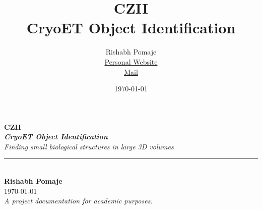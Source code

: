 \documentclass{report}
\title{\textbf{\Huge{CZII}\\CryoET Object Identification}}
\author{\huge{Rishabh Pomaje}\\
\href{https://sites.google.com/view/rishabh-pomaje/about}{Personal Website}\\
\href{rishabhpomaje@gmail.com}{Mail}}
\date{\today}
\begin{document}
\begin{titlepage}
    \centering
    {\Huge\bfseries CZII \\[0.5cm]
    \textcolor{green!50!black}{\textit{CryoET Object Identification}}}\\[2cm]
    
    {\Large\itshape Finding small biological structures in large 3D volumes}\\[2.5cm]
    
    \rule{\textwidth}{0.5mm} \\[0.5cm]
    
    {\large\textbf{Rishabh Pomaje}}\\[0.2cm]
    
    
    {\today}\\[2.5cm]
    
    {\itshape A project documentation for academic purposes.}
\end{titlepage}

\newpage%
\tableofcontents
\pagebreak




\end{document}
